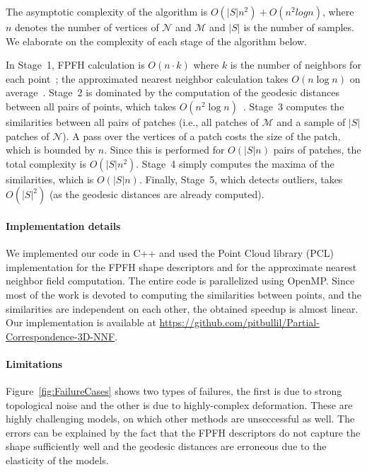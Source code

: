 The asymptotic complexity of the algorithm is $O(|S|n^2) + O(n^2logn)$, where $n$ denotes the  number of vertices of  $\mathcal{N}$ and $\mathcal{M}$ and $|S|$ is the number of samples.
We elaborate on the complexity of each stage of the algorithm below.

In Stage~1,
FPFH calculation is $O(n \cdot k)$ where $k$ is the number of neighbors for each point~\cite{rusu2009fast};
the approximated nearest neighbor calculation takes $O(n \log{n})$ on average~\cite{bentley1975multidimensional}.
Stage~2 is dominated by the computation of the geodesic distances between all pairs of points, which takes $O(n^2\log{n})$~\cite{kimmel1996fast}.
%
Stage~3 computes the similarities between all pairs of patches (i.e., all patches of  $\mathcal{M}$ and a sample of $|S|$ patches of $\mathcal{N}$).
A pass over the vertices of a patch costs the size of the patch, which is bounded by $n$.
Since this is performed for $O(|S|n)$ pairs of patches, the total complexity is $O(|S|n^2)$.
Stage~4 simply computes the maxima of the similarities, which is $O(|S|n)$. 
Finally, Stage~5, which detects outliers, takes  $O(|S|^2)$ (as the geodesic distances are already computed).



\paragraph{Implementation details}
We implemented our code in C++  and used the Point Cloud library (PCL)~\cite{Rusu_ICRA2011_PCL} implementation for the FPFH shape descriptors and for the approximate nearest neighbor field computation.
The entire code is parallelized using OpenMP.
Since most of the work is devoted to computing the similarities between points, and the similarities are independent on each other, the obtained speedup is almost linear. Our implementation is available at \url{https://github.com/pitbullil/Partial-Correspondence-3D-NNF}.


\paragraph{Limitations}
Figure~\ref{fig:FailureCases} shows two types of failures, the first is due to strong topological noise and the other is due to highly-complex deformation.
These are highly challenging models, on which other methods are unseccessful as well.
The errors can be explained by the fact that the FPFH descriptors do not capture the shape sufficiently well and the geodesic distances are erroneous due to the elasticity of the models.


